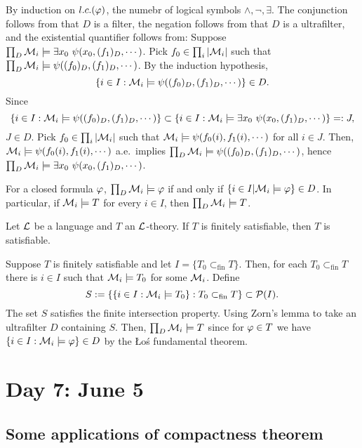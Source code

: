 \documentclass{../../../small}
\begin{document}
\begin{pf}
By induction on $l.c.(\varphi)$, the numebr of logical symbols $\wedge,\neg,\exists$.
The conjunction follows from that $D$ is a filter, the negation follows from that $D$ is a ultrafilter, and the existential quantifier follows from:
Suppose $\prod_D\cM_i\models\exists x_0\ \psi(x_0,(f_1)_D,\cdots)$.
Pick $f_0\in\prod_i|\mathcal{M}_i|$ such that $\prod_D\mathcal{M}_i\models\psi((f_0)_D,(f_1)_D,\cdots)$.
By the induction hypothesis,
\[\{i\in I:\mathcal{M}_i\models\psi((f_0)_D,(f_1)_D,\cdots)\}\in D.\]
Since
\[\{i\in I:\mathcal{M}_i\models\psi((f_0)_D,(f_1)_D,\cdots)\}\subset\{i\in I:\mathcal{M}_i\models\exists x_0\ \psi(x_0,(f_1)_D,\cdots)\}=:J,\]
$J\in D$.
Pick $f_0\in\prod_i|\mathcal{M}_i|$ such that $\mathcal{M}_i\models\psi(f_0(i),f_1(i),\cdots)$ for all $i\in J$.
Then, $\mathcal{M}_i\models\psi(f_0(i),f_1(i),\cdots)$ a.e.~implies $\prod_D\mathcal{M}_i\models\psi((f_0)_D,(f_1)_D,\cdots)$, hence $\prod_D\cM_i\models\exists x_0\ \psi(x_0,(f_1)_D,\cdots)$.
\end{pf}

\begin{cor*}
For a closed formula $\varphi$, $\prod_D\mathcal{M}_i\models\varphi$ if and only if $\{i\in I|\mathcal{M}_i\models\varphi\}\in D$.
In particular, if $\mathcal{M}_i\models T$ for every $i\in I$, then $\prod_D\mathcal{M}_i\models T$.
\end{cor*}


\begin{thm*}
Let $\mathcal{L}$ be a language and $T$ an $\mathcal{L}$-theory.
If $T$ is finitely satisfiable, then $T$ is satisfiable.
\end{thm*}
\begin{pf}
Suppose $T$ is finitely satisfiable and let $I=\{T_0\subset_{\mathrm{fin}}T\}$.
Then, for each $T_0\subset_{\mathrm{fin}}T$ there is $i\in I$ such that $\mathcal{M}_i\models T_0$ for some $\mathcal{M}_i$.
Define
\[S:=\{\{i\in I:\mathcal{M}_i\models T_0\}:T_0\subset_{\mathrm{fin}}T\}\subset\mathcal{P}(I).\]
The set $S$ satisfies the finite intersection property.
Using Zorn's lemma to take an ultrafilter $D$ containing $S$.
Then, $\prod_D\mathcal{M}_i\models T$ since for $\varphi\in T$ we have $\{i\in I:\mathcal{M}_i\models\varphi\}\in D$ by the \L o\'s fundamental theorem.
\end{pf}


\newpage
\section{Day 7: June 5}

\subsection*{Some applications of compactness theorem}
\end{document}
